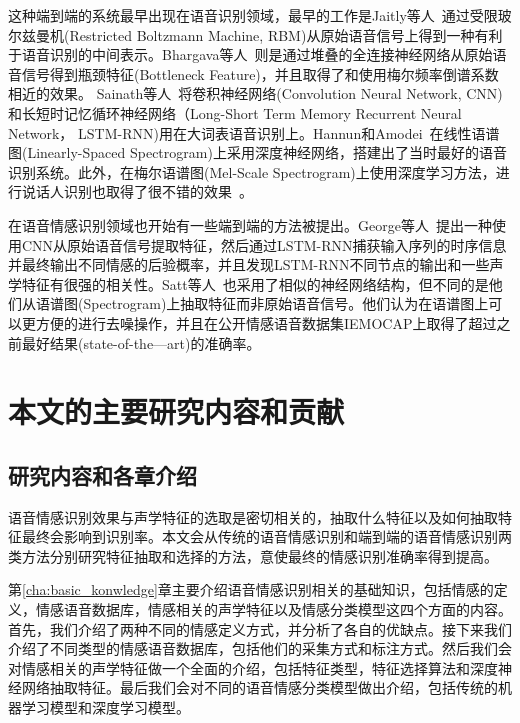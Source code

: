 这种端到端的系统最早出现在语音识别领域，最早的工作是Jaitly等人~\cite{Jaitly2011Learning}通过受限玻尔兹曼机(Restricted Boltzmann Machine, RBM)从原始语音信号上得到一种有利于语音识别的中间表示。Bhargava等人~\cite{Bhargava2015Architectures}则是通过堆叠的全连接神经网络从原始语音信号得到瓶颈特征(Bottleneck Feature)，并且取得了和使用梅尔频率倒谱系数相近的效果。 Sainath等人~\cite{Sainath2015Convolutional}将卷积神经网络(Convolution Neural Network, CNN)和长短时记忆循环神经网络（Long-Short Term Memory Recurrent Neural Network， LSTM-RNN)用在大词表语音识别上。Hannun和Amodei~\cite{Amodei2015Deep}在线性语谱图(Linearly-Spaced Spectrogram)上采用深度神经网络，搭建出了当时最好的语音识别系统。此外，在梅尔语谱图(Mel-Scale Spectrogram)上使用深度学习方法，进行说话人识别也取得了很不错的效果~\cite{Variani2014Deep}。

在语音情感识别领域也开始有一些端到端的方法被提出。George等人~\cite{Trigeorgis2016Adieu}提出一种使用CNN从原始语音信号提取特征，然后通过LSTM-RNN捕获输入序列的时序信息并最终输出不同情感的后验概率，并且发现LSTM-RNN不同节点的输出和一些声学特征有很强的相关性。Satt等人~\cite{Satt2017Efficient}也采用了相似的神经网络结构，但不同的是他们从语谱图(Spectrogram)上抽取特征而非原始语音信号。他们认为在语谱图上可以更方便的进行去噪操作，并且在公开情感语音数据集IEMOCAP上取得了超过之前最好结果(state-of-the—art)的准确率。

\section{本文的主要研究内容和贡献}
\label{sec:content_contribution}

\subsection{研究内容和各章介绍}
\label{ssec:content}
语音情感识别效果与声学特征的选取是密切相关的，抽取什么特征以及如何抽取特征最终会影响到识别率。本文会从传统的语音情感识别和端到端的语音情感识别两类方法分别研究特征抽取和选择的方法，意使最终的情感识别准确率得到提高。

 第\ref{cha:basic_konwledge}章主要介绍语音情感识别相关的基础知识，包括情感的定义，情感语音数据库，情感相关的声学特征以及情感分类模型这四个方面的内容。首先，我们介绍了两种不同的情感定义方式，并分析了各自的优缺点。接下来我们介绍了不同类型的情感语音数据库，包括他们的采集方式和标注方式。然后我们会对情感相关的声学特征做一个全面的介绍，包括特征类型，特征选择算法和深度神经网络抽取特征。最后我们会对不同的语音情感分类模型做出介绍，包括传统的机器学习模型和深度学习模型。

